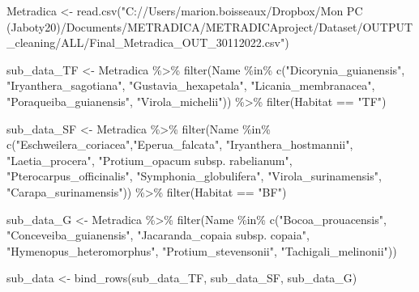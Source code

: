 \documentclass[
]{book}
\newenvironment{Shaded}{\begin{snugshade}}{\end{snugshade}}
\newcommand{\FunctionTok}[1]{\textcolor[rgb]{0.00,0.00,0.00}{#1}}
\newcommand{\NormalTok}[1]{#1}
\newcommand{\OtherTok}[1]{\textcolor[rgb]{0.56,0.35,0.01}{#1}}
\newcommand{\SpecialCharTok}[1]{\textcolor[rgb]{0.00,0.00,0.00}{#1}}
\newcommand{\StringTok}[1]{\textcolor[rgb]{0.31,0.60,0.02}{#1}}
\begin{document}
\begin{Shaded}
\begin{Highlighting}[]
\NormalTok{Metradica }\OtherTok{\textless{}{-}} \FunctionTok{read.csv}\NormalTok{(}\StringTok{"C://Users/marion.boisseaux/Dropbox/Mon PC (Jaboty20)/Documents/METRADICA/METRADICAproject/Dataset/OUTPUT\_cleaning/ALL/Final\_Metradica\_OUT\_30112022.csv"}\NormalTok{)}

\NormalTok{sub\_data\_TF }\OtherTok{\textless{}{-}}\NormalTok{ Metradica }\SpecialCharTok{\%\textgreater{}\%}
  \FunctionTok{filter}\NormalTok{(Name }\SpecialCharTok{\%in\%} \FunctionTok{c}\NormalTok{(}\StringTok{"Dicorynia\_guianensis"}\NormalTok{, }\StringTok{"Iryanthera\_sagotiana"}\NormalTok{, }\StringTok{"Gustavia\_hexapetala"}\NormalTok{, }\StringTok{"Licania\_membranacea"}\NormalTok{, }\StringTok{"Poraqueiba\_guianensis"}\NormalTok{, }\StringTok{"Virola\_michelii"}\NormalTok{)) }\SpecialCharTok{\%\textgreater{}\%} \FunctionTok{filter}\NormalTok{(Habitat }\SpecialCharTok{==} \StringTok{"TF"}\NormalTok{)}

\NormalTok{sub\_data\_SF }\OtherTok{\textless{}{-}}\NormalTok{ Metradica }\SpecialCharTok{\%\textgreater{}\%}
  \FunctionTok{filter}\NormalTok{(Name }\SpecialCharTok{\%in\%} \FunctionTok{c}\NormalTok{(}\StringTok{"Eschweilera\_coriacea"}\NormalTok{,}\StringTok{"Eperua\_falcata"}\NormalTok{, }\StringTok{"Iryanthera\_hostmannii"}\NormalTok{, }\StringTok{"Laetia\_procera"}\NormalTok{, }\StringTok{"Protium\_opacum subsp. rabelianum"}\NormalTok{, }\StringTok{"Pterocarpus\_officinalis"}\NormalTok{, }\StringTok{"Symphonia\_globulifera"}\NormalTok{, }\StringTok{"Virola\_surinamensis"}\NormalTok{, }\StringTok{"Carapa\_surinamensis"}\NormalTok{)) }\SpecialCharTok{\%\textgreater{}\%} \FunctionTok{filter}\NormalTok{(Habitat }\SpecialCharTok{==} \StringTok{"BF"}\NormalTok{)}

\NormalTok{sub\_data\_G }\OtherTok{\textless{}{-}}\NormalTok{  Metradica }\SpecialCharTok{\%\textgreater{}\%}
  \FunctionTok{filter}\NormalTok{(Name }\SpecialCharTok{\%in\%} \FunctionTok{c}\NormalTok{(}\StringTok{"Bocoa\_prouacensis"}\NormalTok{, }\StringTok{"Conceveiba\_guianensis"}\NormalTok{, }\StringTok{"Jacaranda\_copaia subsp. copaia"}\NormalTok{, }\StringTok{"Hymenopus\_heteromorphus"}\NormalTok{, }\StringTok{"Protium\_stevensonii"}\NormalTok{, }\StringTok{"Tachigali\_melinonii"}\NormalTok{))}

\NormalTok{sub\_data }\OtherTok{\textless{}{-}} \FunctionTok{bind\_rows}\NormalTok{(sub\_data\_TF, sub\_data\_SF, sub\_data\_G)}


\end{Highlighting}
\end{Shaded}
\end{document}
